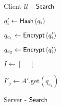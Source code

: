 \noindent
\begin{figure}[H]
    \begin{minipage}{0.5\textwidth}
        \begin{algorithm}[H]
            \LinesNumbered
            \caption{Client $ \mathcal{U} $ - \newline $ \mathsf{{Search}} $}
            \label{algo:ClientSearch}
    
    
            \vspace*{0.48cm}
    
            $ q'_i \gets \mathsf{Hash} \left( q_i \right) $
    
            \MPC{} {
    
            
    
                \vspace*{0.48cm}
    
                $ q_{e_1} \gets \mathsf{{Encrypt}} \left( q'_i \right) $
            }
    
            \MPC{} {
    
            
    
                \vspace*{0.48cm}
    
                $ q_{e_2} \gets \mathsf{{Encrypt}} \left( q'_i \right) $
            }
    
            $ I \gets \left[ \phantom{=} \right] $
    
            $ I'_j \gets A' $.get$ \left( q_{e_1} \right) $ 
    
    
            \vspace*{0.48cm}
    
    
        \end{algorithm}
    \end{minipage}
    \begin{minipage}{0.49\textwidth}
        \begin{algorithm}[H]
            \LinesNumbered
            \caption{Server - \newline $ \mathsf{{Search}} $}
            \label{algo:ServerSearch}
    

\end{algorithm}
\end{minipage}
\end{figure}
